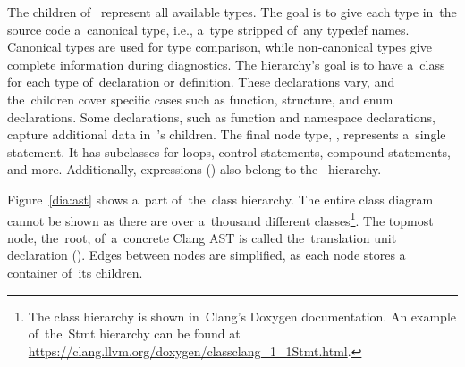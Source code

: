 The children of~ represent all available types.
The goal is to give each type in~the source code a~canonical type,
i.e., a~type stripped of~any typedef names. 
Canonical types are used for type comparison, while non-canonical 
types give complete information during diagnostics. 
The  hierarchy's goal is to have a~class for each 
type of~declaration or definition. 
These declarations vary, and the~children cover specific cases 
such as function, structure, and enum declarations. 
Some declarations, such as function and namespace declarations, 
capture additional data in~'s children. 
The final node type, , represents a~single statement. 
It has subclasses for loops, control statements, compound statements, 
and more. 
Additionally, expressions () also belong 
to the~ hierarchy.

Figure~\ref{dia:ast} shows a~part of~the~class hierarchy. 
The entire class diagram cannot be shown as there are over a~thousand 
different classes\footnote{The class hierarchy is shown in~Clang's
Doxygen documentation. An example of~the~Stmt hierarchy can be found
at \url{https://clang.llvm.org/doxygen/classclang_1_1Stmt.html}.}. 
The topmost node, the~root, of~a~concrete Clang AST is called the~translation
unit declaration (). 
Edges between nodes are simplified, as each node stores 
a container of~its children.


